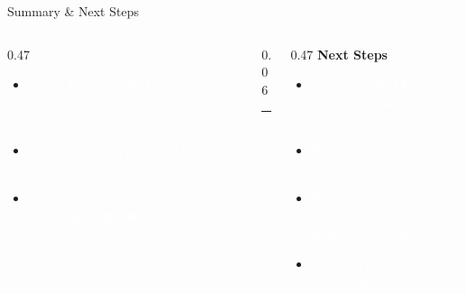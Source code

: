 \documentclass[aspectratio=169, 10pt]{beamer}
\begin{document}
{
\begin{frame}{Summary \& Next Steps}
\begin{columns}[T, totalwidth=\textwidth]

  \begin{column}{0.47\textwidth}
    \begin{itemize}\setlength\itemsep{9pt}
      \item[\textcolor{cmint}{$\checkmark$}]
            \textcolor{white}{GP on first 2 dyadic levels:
            only 5\% raw anchors (vs 100\%) and tighter
            early-level residuals}
      \item[\textcolor{cmint}{$\checkmark$}]
            \textcolor{white}{Error bound $\pm\varepsilon_b$
            preserved identically to SZ3}
      \item[\textcolor{cmint}{$\checkmark$}]
            \textcolor{white}{Seamless handoff: levels 2+
            identical to SZ3 \texttt{ALGO\_INTERP}}
    \end{itemize}
  \end{column}

  \begin{column}{0.06\textwidth}
    \color{cteal}\rule{1pt}{0.72\textheight}
  \end{column}

  \begin{column}{0.47\textwidth}
    {\bfseries\color{cmid} Next Steps}\smallskip
    \begin{itemize}\setlength\itemsep{9pt}
      \item[\textcolor{cmint}{$\to$}]
            \textcolor{white}{Adaptive GP\_LEVELS: switch to cubic
            when mean $|q| < \theta$}
      \item[\textcolor{cmint}{$\to$}]
            \textcolor{white}{RPCholesky at level 1+ as well}
      \item[\textcolor{cmint}{$\to$}]
            \textcolor{white}{RD benchmark: Miranda, Nyx, RTM
            with full Huffman encoding}
      \item[\textcolor{cmint}{$\to$}]
            \textcolor{white}{Scale to cluster; combine with
            Patch GP}
    \end{itemize}
  \end{column}

\end{columns}
\end{frame}
}
\end{document}
